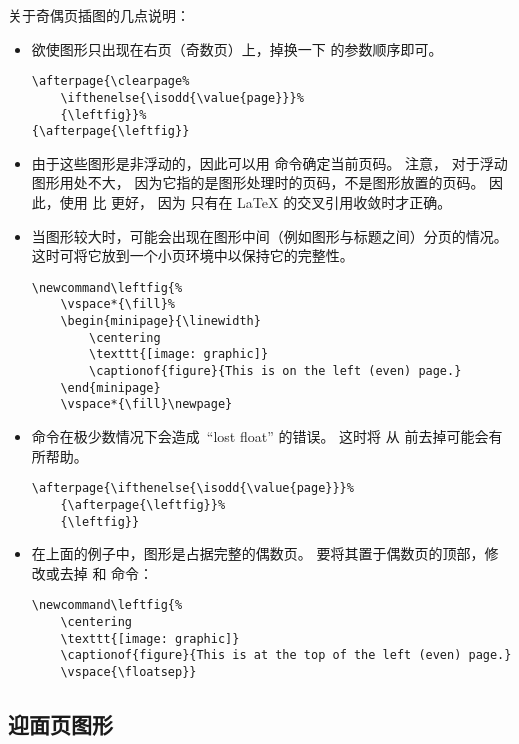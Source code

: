关于奇偶页插图的几点说明：
\begin{itemize}
	\item 欲使图形只出现在右页（奇数页）上，掉换一下  的参数顺序即可。
\begin{lstlisting}
\afterpage{\clearpage% 
	\ifthenelse{\isodd{\value{page}}}% 
	{\leftfig}}%
{\afterpage{\leftfig}}
\end{lstlisting}
	\item 由于这些图形是非浮动的，因此可以用  命令确定当前页码。
	注意， 对于浮动图形用处不大，
	因为它指的是图形处理时的页码，不是图形放置的页码。
	因此，使用  比  更好，
	因为  只有在 \LaTeX{} 的交叉引用收敛时才正确。
	
	\item 当图形较大时，可能会出现在图形中间（例如图形与标题之间）分页的情况。
	这时可将它放到一个小页环境中以保持它的完整性。
\begin{lstlisting}
\newcommand\leftfig{%
	\vspace*{\fill}%
	\begin{minipage}{\linewidth}
		\centering
		\texttt{[image: graphic]}
		\captionof{figure}{This is on the left (even) page.}
	\end{minipage}
	\vspace*{\fill}\newpage}
\end{lstlisting}

	\item {} 命令在极少数情况下会造成~``lost float'' 的错误。
	这时将  从  前去掉可能会有所帮助。
\begin{lstlisting}
\afterpage{\ifthenelse{\isodd{\value{page}}}%
	{\afterpage{\leftfig}}%
	{\leftfig}}
\end{lstlisting}
	
	\item 在上面的例子中，图形是占据完整的偶数页。
	要将其置于偶数页的顶部，修改或去掉  和  命令：
\begin{lstlisting}
\newcommand\leftfig{%
	\centering
	\texttt{[image: graphic]}
	\captionof{figure}{This is at the top of the left (even) page.}
	\vspace{\floatsep}}
\end{lstlisting}

\end{itemize}

\subsection{迎面页图形}\label{ssec:fig-facingpage}

